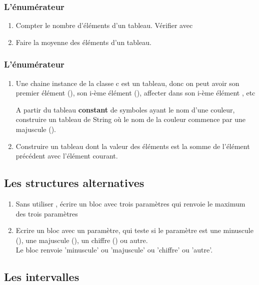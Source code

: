 \subsubsection{L'\'enum\'erateur }

\begin{enumerate}
\item
Compter le nombre d'\'el\'ements d'un tableau. V\'erifier avec 
\item
Faire la moyenne des \'el\'ements d'un tableau.
\end{enumerate}

\subsubsection{L'\'enum\'erateur }

\begin{enumerate}
\item
Une chaine instance de la classe c est un tableau, donc on peut avoir son premier \'el\'ement (), son i-\`eme \'el\'ement (), affecter
 dans son i-\`eme \'el\'ement , etc

A partir du tableau {\bf constant} de symboles  ayant le nom
d'une couleur, construire un tableau de String o\`u le nom de la couleur
commence par une majuscule ().

\item
Construire un tableau dont la valeur des \'el\'ements est la somme de
l'\'el\'ement pr\'ec\'edent avec l'\'el\'ement courant.
\end{enumerate}

\subsection{Les structures alternatives}
\begin{enumerate}
\item
Sans utiliser , \'ecrire un bloc avec trois param\`etres qui renvoie le maximum des trois param\`etres
\item
Ecrire un bloc avec un param\`etre, qui teste si le param\`etre est
une minuscule (), une majuscule (),
un chiffre () ou autre.\\
Le bloc renvoie 'minuscule' ou 'majuscule' ou 'chiffre' ou 'autre'.
\end{enumerate}

\subsection{Les intervalles}
 
